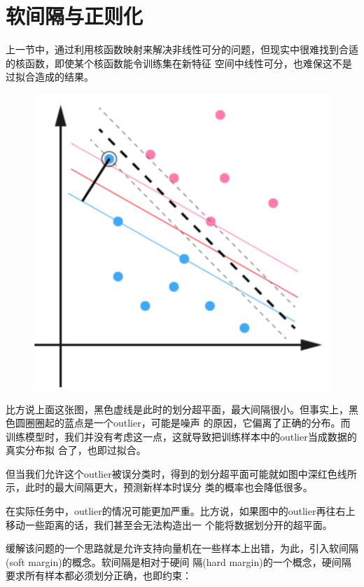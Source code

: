 \documentclass[UTF8]{ctexart}
\begin{document}
{\section{软间隔与正则化}
上一节中，通过利用核函数映射来解决非线性可分的问题，但现实中很难找到合适的核函数，即使某个核函数能令训练集在新特征
空间中线性可分，也难保这不是过拟合造成的结果。
\begin{figure}[ht]
    \centering
    \includegraphics[scale=0.5]{05.png}
\end{figure}
比方说上面这张图，黑色虚线是此时的划分超平面，最大间隔很小。但事实上，黑色圆圈圈起的蓝点是一个outlier，可能是噪声
的原因，它偏离了正确的分布。而训练模型时，我们并没有考虑这一点，这就导致把训练样本中的outlier当成数据的真实分布拟
合了，也即过拟合。\par
但当我们允许这个outlier被误分类时，得到的划分超平面可能就如图中深红色线所示，此时的最大间隔更大，预测新样本时误分
类的概率也会降低很多。\par
在实际任务中，outlier的情况可能更加严重。比方说，如果图中的outlier再往右上移动一些距离的话，我们甚至会无法构造出一
个能将数据划分开的超平面。\par
缓解该问题的一个思路就是允许支持向量机在一些样本上出错，为此，引入软间隔(soft margin)的概念。软间隔是相对于硬间
隔(hard margin)的一个概念，硬间隔要求所有样本都必须划分正确，也即约束：
\begin{center}

\end{center}}
\end{document}
